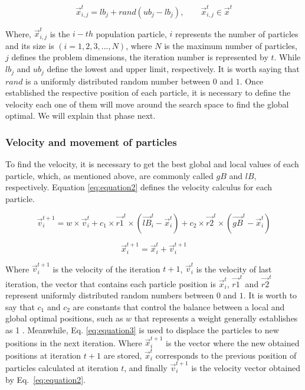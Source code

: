 \begin{equation}
\vec{x}_{i,j}^t=lb_j+rand(ub_j-lb_j),\qquad \vec{x}_{i,j}^t \in \vec{x}^{t}
\label{eq:equation1}
\end{equation}

Where, $\vec{x}_{i,j}^t$ is the $i-th$ population particle, $i$ represents the number of particles and its size is $(i=1,2,3,...,N)$, where $N$ is the maximum number of particles, $j$ defines the problem dimensions, the iteration number is represented by $t$. While $lb_j$ and $ub_j$ define the lowest and upper limit, respectively. It is worth saying that $rand$ is a uniformly distributed random number between $0$ and $1$. Once established the respective position of each particle, it is necessary to define the velocity each one of them will move around the search space to find the global optimal. We will explain that phase next.

\subsubsection{Velocity and movement of particles}

To find the velocity, it is necessary to get the best global and local values of each particle, which, as mentioned above, are commonly called $gB$ and $lB$, respectively. Equation \ref{eq:equation2} defines the velocity calculus for each particle.

\begin{equation}
\vec{v}_i^{t+1}=w \times \vec{v}_i^{t}+c_{1} \times \vec{r1}^t \times (\vec{lB}_i^t-\vec{x}^{t}_i)+c_{2} \times \vec{r2}^t \times (\vec{gB}^t-\vec{x}^{t}_i)
\label{eq:equation2}
\end{equation}

\begin{equation}
\vec{x}_i^{t+1}=\vec{x}_i^{t}+\vec{v}_i^{t+1}
\label{eq:equation3}
\end{equation}

Where $\vec{v}_i^{t+1}$ is the velocity of the iteration $t+1$, $\vec{v}_i^{t}$ is the velocity of last iteration, the vector that contains each particle position is $\vec{x}_i^{t}$, $\vec{r1}^t$ and $\vec{r2}^t$ represent uniformly distributed random numbers between $0$ and $1$. It is worth to say that $c_{1}$ and $c_{2}$ are constants that control the balance between a local and global optimal positions, such as $w$ that represents a weight generally establishes as 1 . Meanwhile, Eq. \ref{eq:equation3} is used to displace the particles to new positions in the next iteration. Where $\vec{x}_i^{t+1}$ is the vector where the new obtained positions at iteration $t+1$ are stored, $\vec{x}_i^{t}$ corresponds to the previous position of particles calculated at iteration $t$, and finally $\vec{v}_i^{t+1}$ is the velocity vector obtained by Eq.~\ref{eq:equation2}.

